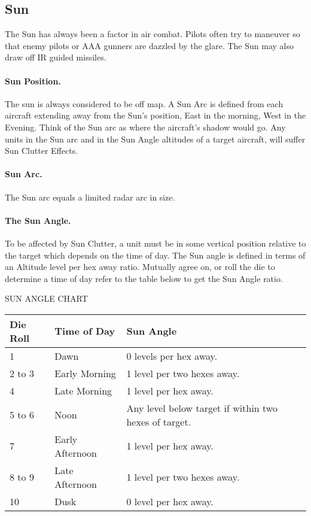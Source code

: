 \subsection{Sun}

The Sun has always been a factor in air combat. Pilots often try to maneuver so that enemy pilots or AAA gunners are dazzled by the glare. The Sun may also draw off IR guided missiles.

\paragraph{Sun Position.} The sun is always considered to be off map. A Sun Arc is defined from each aircraft extending away from the Sun's position, East in the morning, West in the Evening. Think of the Sun arc as where the aircraft's shadow would go. Any units in the Sun arc and in the Sun Angle altitudes of a target aircraft, will suffer Sun Clutter Effects.

\paragraph{Sun Arc.} The Sun arc equals a limited radar arc in size. 


\paragraph{The Sun Angle.} To be affected by Sun Clutter, a unit must be in some vertical position relative to the target which depends on the time of day. The Sun angle is defined in terms of an Altitude level per hex away ratio. Mutually agree on, or roll the die to determine a time of day refer to the table below to get the Sun Angle ratio.

\begin{table}[!ht]
\centering
SUN ANGLE CHART

\medskip
\begin{tabular}{llp{4cm}}
\hline
Die Roll   &Time of Day        &Sun Angle \\
\hline
1          &Dawn	           &0 levels per hex away. \\
2 to 3     &Early Morning      &1 level per two hexes away. \\
4	       &Late Morning	   &1 level per hex away. \\
5 to 6     &Noon	           &Any level below target if within two hexes of target. \\
7	       &Early Afternoon    &1 level per hex away. \\
8 to 9     &Late Afternoon     &1 level per two hexes away. \\
10	       &Dusk	           &0 level per hex away. \\
\hline
\end{tabular}
\end{table}

